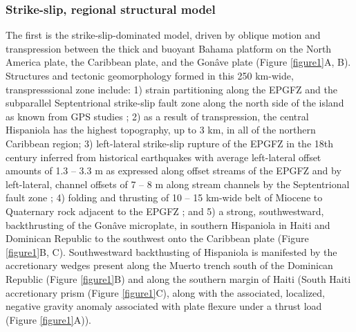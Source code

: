 \documentclass[linenumbers,draft]{agujournal}
\begin{document}
\subsubsection{Strike-slip, regional structural model}
The first is the strike-slip-dominated model, driven by oblique motion and transpression between the thick and buoyant Bahama platform on the North America plate, the Caribbean plate, and the Gon\^ave plate \citep{mann1995actively,dolan1998active,mann2002oblique,calais2002strain,calais2016plate} (Figure \ref{figure1}A, B). Structures and tectonic geomorphology formed in this 250 km-wide, transpresssional zone include: 1) strain partitioning along the EPGFZ and the subparallel Septentrional strike-slip fault zone along the north side of the island as known from GPS studies \citep{calais2002strain,calais2010transpressional,hayes2010complex,symithe2013coseismic,douilly2013crustal,douilly2015three}; 2) as a result of transpression, the central Hispaniola has the highest topography, up to 3 km, in all of the northern Caribbean region; 3) left-lateral strike-slip rupture of the EPGFZ in the 18th century inferred from historical earthquakes \citep{bakun2012significant} with average left-lateral offset amounts of 1.3 -- 3.3 m as expressed along offset streams of the EPGFZ \citep{prentice2010seismic} and by left-lateral, channel offsets of 7 -- 8 m along stream channels by the Septentrional fault zone \citep{prentice1993paleoseismicity}; 4) folding and thrusting of 10 -- 15 km-wide belt of Miocene to Quaternary rock adjacent to the EPGFZ \citep{saint2015seismotectonics}; and 5) a strong, southwestward, backthrusting of the Gon\^ave microplate, in southern Hispaniola in Haiti and Dominican Republic to the southwest onto the Caribbean plate \citep{mann2002oblique,grindlay2005high,kroehler2011late} (Figure \ref{figure1}B, C). Southwestward backthusting of Hispaniola is manifested by the accretionary wedges present along the Muerto trench south of the Dominican Republic \citep{bien1986contribution,bruna2009morphotectonics} (Figure \ref{figure1}B) and along the southern margin of Haiti (South Haiti accretionary prism \citep{bien1986contribution} (Figure \ref{figure1}C), along with the associated, localized, negative gravity anomaly associated with plate flexure under a thrust load \citep{mann2002oblique,bruna2009morphotectonics} (Figure \ref{figure1}A)).
\end{document}
